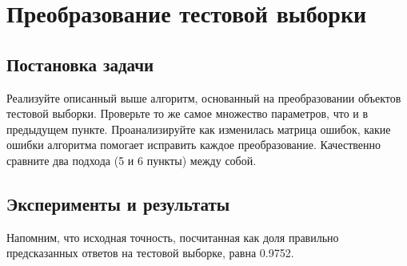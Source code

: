 \documentclass{article}
\begin{document}
\section{Преобразование тестовой выборки}

\subsection{Постановка задачи}
Реализуйте описанный выше алгоритм, основанный на преобразовании объектов тестовой выборки. Проверьте то же самое множество параметров, что и в предыдущем пункте. Проанализируйте как изменилась матрица ошибок, какие ошибки алгоритма помогает исправить каждое преобразование. Качественно сравните два подхода (5 и 6 пункты) между собой.


\subsection{Эксперименты и результаты}
Напомним, что исходная точность, посчитанная как доля правильно предсказанных ответов на тестовой выборке, равна 0.9752.
\end{document}
